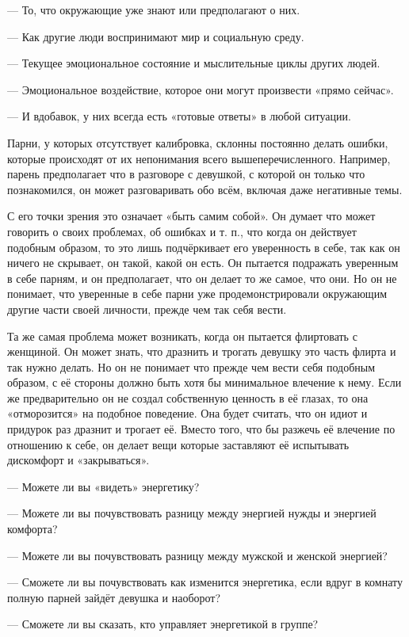 --- То, что окружающие уже знают или предполагают о них.

--- Как другие люди воспринимают мир и социальную среду.

--- Текущее эмоциональное состояние и мыслительные циклы других людей.

--- Эмоциональное воздействие, которое они могут произвести «прямо сейчас».

--- И вдобавок, у них всегда есть «готовые ответы» в любой ситуации.

Парни, у которых отсутствует калибровка, склонны постоянно делать ошибки, которые происходят от их непонимания всего вышеперечисленного. Например, парень предполагает что в разговоре с девушкой, с которой он только что познакомился, он может разговаривать обо всём, включая даже негативные темы.

С его точки зрения это означает «быть самим собой». Он думает что может говорить о своих проблемах, об ошибках и т. п., что когда он действует подобным образом, то это лишь подчёркивает его уверенность в себе, так как он ничего не скрывает, он такой, какой он есть. Он пытается подражать уверенным в себе парням, и он предполагает, что он делает то же самое, что они. Но он не понимает, что уверенные в себе парни уже продемонстрировали окружающим другие части своей личности, прежде чем так себя вести.

Та же самая проблема может возникать, когда он пытается флиртовать с женщиной. Он может знать, что дразнить и трогать девушку это часть флирта и так нужно делать. Но он не понимает что прежде чем вести себя подобным образом, с её стороны должно быть хотя бы минимальное влечение к нему. Если же предварительно он не создал собственную ценность в её глазах, то она «отморозится» на подобное поведение. Она будет считать, что он идиот и придурок раз дразнит и трогает её. Вместо того, что бы разжечь её влечение по отношению к себе, он делает вещи которые заставляют её испытывать дискомфорт и «закрываться».

--- Можете ли вы «видеть» энергетику?

--- Можете ли вы почувствовать разницу между энергией нужды и энергией комфорта?

--- Можете ли вы почувствовать разницу между мужской и женской энергией?

--- Сможете ли вы почувствовать как изменится энергетика, если вдруг в комнату полную парней зайдёт девушка и наоборот?

--- Сможете ли вы сказать, кто управляет энергетикой в группе?

